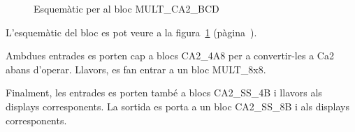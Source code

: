 \begin{figure}[b]
  \begin{center}
  \end{center}
  \caption{\label{fig:\projectname-MULT_CA2_BCD} Esquemàtic per al bloc \textsf{MULT\_CA2\_BCD}}
\end{figure}

L'esquemàtic del bloc es pot veure a la figura~\ref{fig:\projectname-MULT_CA2_BCD} (pàgina~\pageref{fig:\projectname-MULT_CA2_BCD}).

Ambdues entrades es porten cap a blocs \textsf{CA2\_4A8} per a convertir-les a
Ca2 abans d'operar. Llavors, es fan entrar a un bloc \textsf{MULT\_8x8}.

Finalment, les entrades es porten també a blocs \textsf{CA2\_SS\_4B} i llavors
als displays corresponents. La sortida es porta a un bloc \textsf{CA2\_SS\_8B}
i als displays corresponents.

\vspace{1cm}
